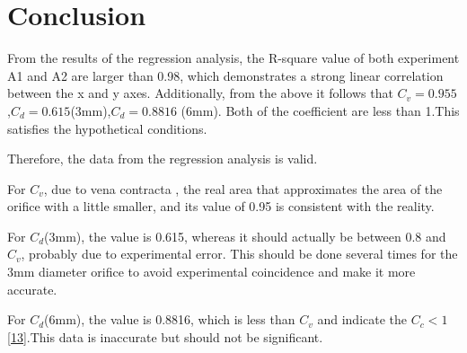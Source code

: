 \section{Conclusion}
\label{sec:conclusion}


From the results of the regression analysis, 
the R-square value of both experiment A1 and A2 are larger than 0.98, 
which demonstrates a strong linear correlation between the x and y axes.
Additionally, from the above it follows that $C_v = 0.955$,$C_d=0.615$(3mm),$C_d=0.8816$
(6mm). Both of the coefficient are less than 1.This satisfies the hypothetical conditions.

Therefore, the data from the regression analysis is valid.

For $C_v$, due to vena contracta , the real area that approximates the area 
of the orifice with a little smaller, 
and its value of 0.95 is consistent with the reality.

For $C_d$(3mm), the value is 0.615, whereas it should actually be between 0.8 and $C_v$, 
probably due to experimental error. 
This should be done several times for the 3mm diameter orifice to avoid 
experimental coincidence and make it more accurate.

For $C_d$(6mm), the value is 0.8816, which is less than $C_v$ and indicate the 
$C_c < 1 $\eqref{13}.This data is inaccurate but should not be significant.